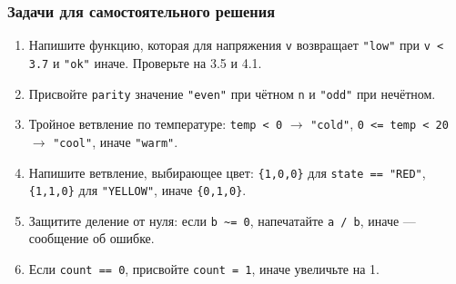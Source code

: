 \subsubsection*{Задачи для самостоятельного решения}
\begin{enumerate}
  \item Напишите функцию, которая для напряжения \verb|v| возвращает \verb|"low"| при \verb|v < 3.7| и \verb|"ok"| иначе. Проверьте на 3.5 и 4.1.
  \item Присвойте \verb|parity| значение \verb|"even"| при чётном \verb|n| и \verb|"odd"| при нечётном.
  \item Тройное ветвление по температуре: \verb|temp < 0| $\to$ \verb|"cold"|, \verb|0 <= temp < 20| $\to$ \verb|"cool"|, иначе \verb|"warm"|.
  \item Напишите ветвление, выбирающее цвет: \verb|{1,0,0}| для \verb|state == "RED"|, \verb|{1,1,0}| для \verb|"YELLOW"|, иначе \verb|{0,1,0}|.
  \item Защитите деление от нуля: если \verb|b ~= 0|, напечатайте \verb|a / b|, иначе --- сообщение об ошибке.
  \item Если \verb|count == 0|, присвойте \verb|count = 1|, иначе увеличьте на 1.
\end{enumerate}

